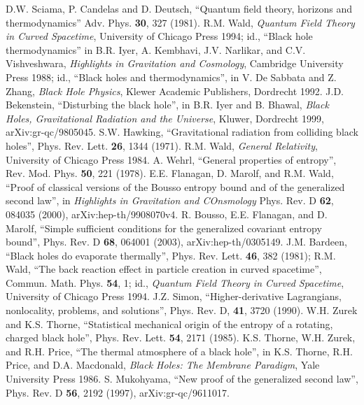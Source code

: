 \documentclass[12pt]{article}
\begin{document}
\begin{thebibliography}{99}
D.W. Sciama, P. Candelas and D. Deutsch, ``Quantum field theory, horizons and thermodynamics''  Adv. Phys. \textbf{30}, 327 (1981).
R.M. Wald, \textit{Quantum Field Theory in Curved Spacetime}, University of Chicago Press 1994; id., ``Black hole thermodynamics'' in B.R. Iyer, A. Kembhavi, J.V. Narlikar, and C.V. Vishveshwara, \textit{Highlights in Gravitation and Cosmology}, Cambridge University Press 1988; id., ``Black holes and thermodynamics'', in V. De Sabbata and Z. Zhang, \textit{Black Hole Physics}, Klewer Academic Publishers, Dordrecht 1992.
J.D. Bekenstein, ``Disturbing the black hole'', in B.R. Iyer and B. Bhawal, \textit{Black Holes, Gravitational Radiation and the Universe}, Kluwer, Dordrecht 1999, arXiv:gr-qc/9805045.
S.W. Hawking, ``Gravitational radiation from colliding black holes'', Phys. Rev. Lett. \textbf{26}, 1344 (1971).
R.M. Wald, \textit{General Relativity}, University of Chicago Press 1984.
A. Wehrl, ``General properties of entropy'', Rev. Mod. Phys. \textbf{50}, 221 (1978).
E.E. Flanagan, D. Marolf, and R.M. Wald, ``Proof of classical versions of the Bousso entropy bound and of the generalized second law'', in \textit{Highlights in Gravitation and COnsmology}
Phys. Rev. D \textbf{62}, 084035 (2000), arXiv:hep-th/9908070v4.
R. Bousso, E.E. Flanagan, and D. Marolf, ``Simple sufficient conditions for the generalized covariant entropy bound'', Phys. Rev. D \textbf{68}, 064001 (2003), arXiv:hep-th/0305149.
J.M. Bardeen, ``Black holes do evaporate thermally'', Phys. Rev. Lett. \textbf{46}, 382 (1981); R.M. Wald, ``The back reaction effect in particle creation in curved spacetime'', Commun. Math. Phys. \textbf{54}, 1; id., \textit{Quantum Field Theory in Curved Spacetime}, University of Chicago Press 1994.
J.Z. Simon, ``Higher-derivative Lagrangians, nonlocality, problems, and solutions'', Phys. Rev. D, \textbf{41}, 3720 (1990).
W.H. Zurek and K.S. Thorne, ``Statistical mechanical origin of the entropy of a rotating, charged black hole'', Phys. Rev. Lett. \textbf{54}, 2171 (1985).
K.S. Thorne, W.H. Zurek, and R.H. Price, ``The thermal atmosphere of a black hole'', in K.S. Thorne, R.H. Price, and D.A. Macdonald, \textit{Black Holes: The Membrane Paradigm}, Yale University Press 1986.
S. Mukohyama, ``New proof of the generalized second law'', Phys. Rev. D \textbf{56}, 2192 (1997), arXiv:gr-qc/9611017.

\end{thebibliography}
\end{document}

